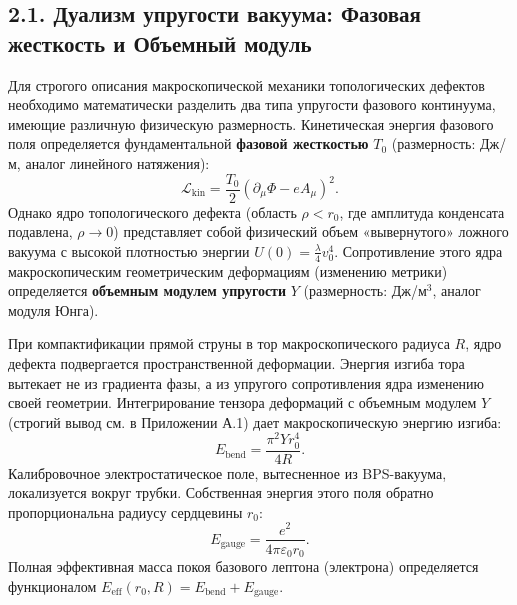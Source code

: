 \documentclass[11pt,a4paper]{article}
\begin{document}
	\subsection{2.1. Дуализм упругости вакуума: Фазовая жесткость и Объемный модуль}
	Для строгого описания макроскопической механики топологических дефектов необходимо математически разделить два типа упругости фазового континуума, имеющие различную физическую размерность.
	Кинетическая энергия фазового поля определяется фундаментальной \textbf{фазовой жесткостью} $T_0$ (размерность: Дж/м, аналог линейного натяжения):
	\begin{equation}
		\mathcal{L}_{\text{kin}} = \frac{T_0}{2} (\partial_\mu \Phi - e A_\mu)^2.
	\end{equation}
	Однако ядро топологического дефекта (область $\rho < r_0$, где амплитуда конденсата подавлена, $\rho \to 0$) представляет собой физический объем «вывернутого» ложного вакуума с высокой плотностью энергии $U(0) = \frac{\lambda}{4}v_0^4$. Сопротивление этого ядра макроскопическим геометрическим деформациям (изменению метрики) определяется \textbf{объемным модулем упругости} $Y$ (размерность: Дж/м$^3$, аналог модуля Юнга). 
	
	При компактификации прямой струны в тор макроскопического радиуса $R$, ядро дефекта подвергается пространственной деформации. Энергия изгиба тора вытекает не из градиента фазы, а из упругого сопротивления ядра изменению своей геометрии. Интегрирование тензора деформаций с объемным модулем $Y$ (строгий вывод см. в Приложении А.1) дает макроскопическую энергию изгиба:
	\begin{equation}
		E_{\text{bend}} = \frac{\pi^2 Y r_0^4}{4 R}.
	\end{equation}
	Калибровочное электростатическое поле, вытесненное из BPS-вакуума, локализуется вокруг трубки. Собственная энергия этого поля обратно пропорциональна радиусу сердцевины $r_0$:
	\begin{equation}
		E_{\text{gauge}} = \frac{e^2}{4\pi\varepsilon_0 r_0}.
	\end{equation}
	Полная эффективная масса покоя базового лептона (электрона) определяется функционалом $E_{\text{eff}}(r_0, R) = E_{\text{bend}} + E_{\text{gauge}}$.
	
\end{document}
